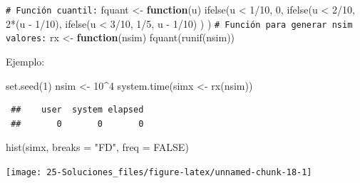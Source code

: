 \documentclass[
]{book}
\newenvironment{Shaded}{\begin{snugshade}}{\end{snugshade}}
\newcommand{\AttributeTok}[1]{\textcolor[rgb]{0.77,0.63,0.00}{#1}}
\newcommand{\CommentTok}[1]{\textcolor[rgb]{0.56,0.35,0.01}{\textit{#1}}}
\newcommand{\ConstantTok}[1]{\textcolor[rgb]{0.00,0.00,0.00}{#1}}
\newcommand{\ControlFlowTok}[1]{\textcolor[rgb]{0.13,0.29,0.53}{\textbf{#1}}}
\newcommand{\DecValTok}[1]{\textcolor[rgb]{0.00,0.00,0.81}{#1}}
\newcommand{\FunctionTok}[1]{\textcolor[rgb]{0.00,0.00,0.00}{#1}}
\newcommand{\NormalTok}[1]{#1}
\newcommand{\OtherTok}[1]{\textcolor[rgb]{0.56,0.35,0.01}{#1}}
\newcommand{\SpecialCharTok}[1]{\textcolor[rgb]{0.00,0.00,0.00}{#1}}
\newcommand{\StringTok}[1]{\textcolor[rgb]{0.31,0.60,0.02}{#1}}
\theoremstyle{break}
\theoremstyle{nonumberplain}
\renewcommand{\CommentTok}[1]{\textcolor[rgb]{0.41,0.41,0.41}{\texttt{#1}}}
\begin{document}
\begin{enumerate}
\begin{Shaded}
\begin{Highlighting}[]
\CommentTok{\# Función cuantil:}
\NormalTok{fquant }\OtherTok{\textless{}{-}} \ControlFlowTok{function}\NormalTok{(u) }
  \FunctionTok{ifelse}\NormalTok{(u }\SpecialCharTok{\textless{}} \DecValTok{1}\SpecialCharTok{/}\DecValTok{10}\NormalTok{, }\DecValTok{0}\NormalTok{,}
         \FunctionTok{ifelse}\NormalTok{(u }\SpecialCharTok{\textless{}} \DecValTok{2}\SpecialCharTok{/}\DecValTok{10}\NormalTok{, }\DecValTok{2}\SpecialCharTok{*}\NormalTok{(u }\SpecialCharTok{{-}} \DecValTok{1}\SpecialCharTok{/}\DecValTok{10}\NormalTok{),}
                \FunctionTok{ifelse}\NormalTok{(u }\SpecialCharTok{\textless{}} \DecValTok{3}\SpecialCharTok{/}\DecValTok{10}\NormalTok{, }\DecValTok{1}\SpecialCharTok{/}\DecValTok{5}\NormalTok{, u }\SpecialCharTok{{-}} \DecValTok{1}\SpecialCharTok{/}\DecValTok{10}\NormalTok{) ) )}
\CommentTok{\# Función para generar nsim valores:}
\NormalTok{rx }\OtherTok{\textless{}{-}} \ControlFlowTok{function}\NormalTok{(nsim) }\FunctionTok{fquant}\NormalTok{(}\FunctionTok{runif}\NormalTok{(nsim))}
\end{Highlighting}
\end{Shaded}

  Ejemplo:

\begin{Shaded}
\begin{Highlighting}[]
\FunctionTok{set.seed}\NormalTok{(}\DecValTok{1}\NormalTok{)}
\NormalTok{nsim }\OtherTok{\textless{}{-}} \DecValTok{10}\SpecialCharTok{\^{}}\DecValTok{4}
\FunctionTok{system.time}\NormalTok{(simx }\OtherTok{\textless{}{-}} \FunctionTok{rx}\NormalTok{(nsim))}
\end{Highlighting}
\end{Shaded}

\begin{verbatim}
 ##    user  system elapsed 
 ##       0       0       0
\end{verbatim}

\begin{Shaded}
\begin{Highlighting}[]
\FunctionTok{hist}\NormalTok{(simx, }\AttributeTok{breaks =} \StringTok{"FD"}\NormalTok{, }\AttributeTok{freq =} \ConstantTok{FALSE}\NormalTok{)}
\end{Highlighting}
\end{Shaded}

  \begin{center}\texttt{[image: 25-Soluciones\_files/figure-latex/unnamed-chunk-18-1]} \end{center}


\end{enumerate}
\end{document}
